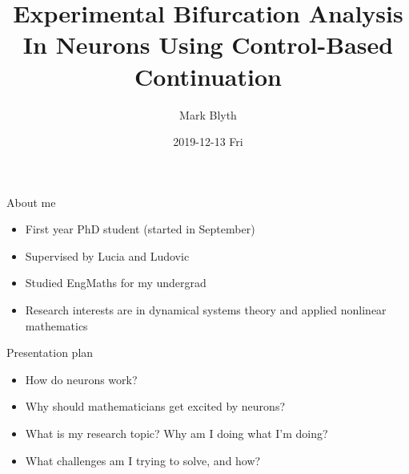 \documentclass[aspectratio=169]{beamer}
\author{Mark Blyth}
\date{2019-12-13 Fri}
\title{Experimental Bifurcation Analysis In Neurons Using Control-Based Continuation}
\begin{document}
\maketitle

\begin{frame}[label={sec:org065c52e}]{About me}
\begin{itemize}
\item First year PhD student (started in September)
\item Supervised by Lucia and Ludovic
\item Studied EngMaths for my undergrad
\item Research interests are in dynamical systems theory and applied nonlinear mathematics
\end{itemize}
\end{frame}


\begin{frame}[label={sec:org84c70ec}]{Presentation plan}
\begin{itemize}[<+->]
\item How do neurons work?
\item Why should mathematicians get excited by neurons?
\item What is my research topic? Why am I doing what I'm doing?
\item What challenges am I trying to solve, and how?
\end{itemize}
\end{frame}
\end{document}
